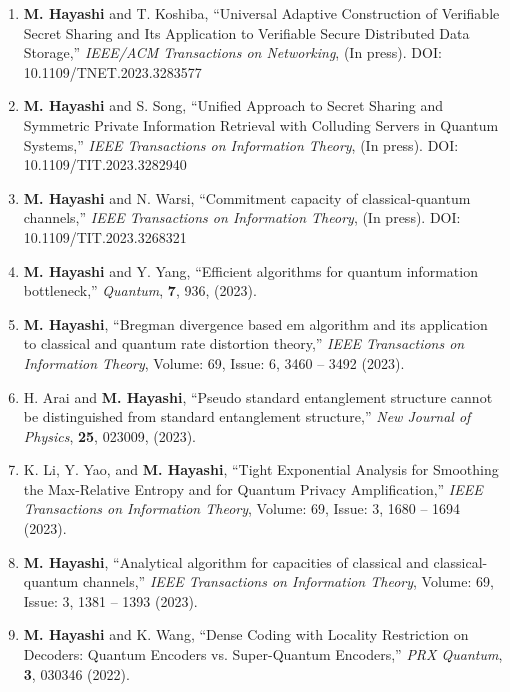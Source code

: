 \documentclass[a4paper,12pt,oneside]{article}
\begin{document}
\begin{enumerate}

\item
\textbf{M. Hayashi} and T. Koshiba,
``Universal Adaptive Construction of Verifiable Secret Sharing and Its Application to Verifiable Secure Distributed Data Storage,''
{\em IEEE/ACM Transactions on Networking},
(In press).
DOI: 10.1109/TNET.2023.3283577

\item
\textbf{M. Hayashi} and S. Song,
``Unified Approach to Secret Sharing and Symmetric Private Information Retrieval with Colluding Servers in Quantum Systems,''
{\em IEEE Transactions on Information Theory},
(In press).
DOI: 10.1109/TIT.2023.3282940

\item
\textbf{M. Hayashi} and N. Warsi,
``Commitment capacity of classical-quantum channels,''
{\em IEEE Transactions on Information Theory},
(In press).
DOI: 10.1109/TIT.2023.3268321

\item
\textbf{M. Hayashi} and Y. Yang,
``Efficient algorithms for quantum information bottleneck,''
{\em Quantum},
{\bf 7}, 936, (2023).

\item
\textbf{M. Hayashi},
``Bregman divergence based em algorithm and its application to classical and quantum rate distortion theory,''
{\em IEEE Transactions on Information Theory},
Volume: 69, Issue: 6, 3460 – 3492 (2023).

\item
H. Arai and \textbf{M. Hayashi},
``Pseudo standard entanglement structure cannot be distinguished from standard entanglement structure,''
{\em New Journal of Physics},
{\bf 25}, 023009, (2023).

\item
K. Li, Y. Yao, and \textbf{M. Hayashi}, 
``Tight Exponential Analysis for Smoothing the Max-Relative Entropy and for Quantum Privacy Amplification,''
{\em IEEE Transactions on Information Theory},
Volume: 69, Issue: 3, 1680 – 1694 (2023).

\item
\textbf{M. Hayashi},
``Analytical algorithm for capacities of classical and classical-quantum channels,''
{\em IEEE Transactions on Information Theory},
Volume: 69, Issue: 3, 1381 – 1393 (2023).

\item
\textbf{M. Hayashi} and K. Wang,
``Dense Coding with Locality Restriction on Decoders: Quantum Encoders vs. Super-Quantum Encoders,''
{\em PRX Quantum},
{\bf 3}, 030346 (2022).


\end{enumerate}
\end{document}
